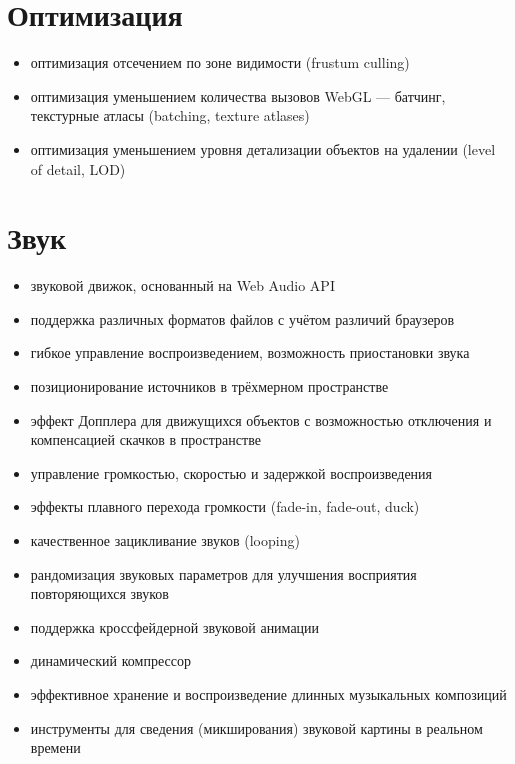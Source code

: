 \documentclass[a4paper,12pt,oneside]{sphinxmanual}
\begin{document}
\section{Оптимизация}
\label{features:id10}\begin{itemize}
\item {} 
оптимизация отсечением по зоне видимости (frustum culling)

\item {} 
оптимизация уменьшением количества вызовов WebGL — батчинг, текстурные атласы (batching, texture atlases)

\item {} 
оптимизация уменьшением уровня детализации объектов на удалении (level of detail, LOD)

\end{itemize}


\section{Звук}
\label{features:id11}\begin{itemize}
\item {} 
звуковой движок, основанный на Web Audio API

\item {} 
поддержка различных форматов файлов с учётом различий браузеров

\item {} 
гибкое управление воспроизведением, возможность приостановки звука

\item {} 
позиционирование источников в трёхмерном пространстве

\item {} 
эффект Допплера для движущихся объектов с возможностью отключения и
компенсацией скачков в пространстве

\item {} 
управление громкостью, скоростью и задержкой воспроизведения

\item {} 
эффекты плавного перехода громкости (fade-in, fade-out, duck)

\item {} 
качественное зацикливание звуков (looping)

\item {} 
рандомизация звуковых параметров для улучшения восприятия повторяющихся звуков

\item {} 
поддержка кроссфейдерной звуковой анимации

\item {} 
динамический компрессор

\item {} 
эффективное хранение и воспроизведение длинных музыкальных композиций

\item {} 
инструменты для сведения (микширования) звуковой картины в реальном времени

\end{itemize}
\end{document}
